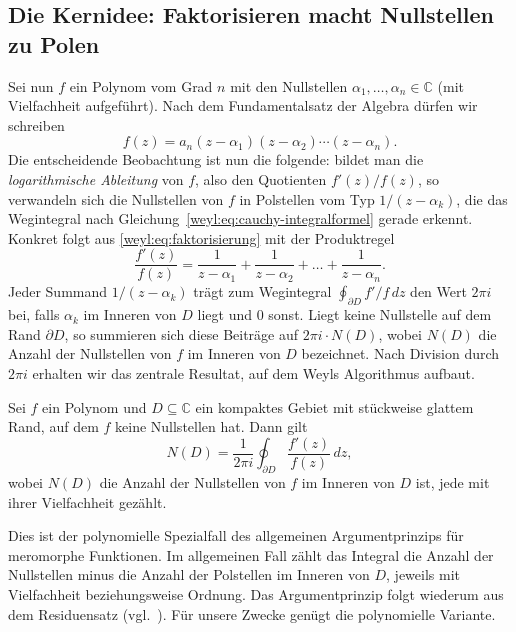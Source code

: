 \subsection{Die Kernidee: Faktorisieren macht Nullstellen zu Polen%
\label{weyl:subsection:kernidee}}
Sei nun $f$ ein Polynom vom Grad $n$ mit den Nullstellen $\alpha_1, \dots, \alpha_n \in \mathbb{C}$
(mit Vielfachheit aufgeführt).
Nach dem Fundamentalsatz der Algebra dürfen wir schreiben
%
\begin{equation}
f(z)
=
a_n (z - \alpha_1)(z - \alpha_2) \cdots (z - \alpha_n)
.
\label{weyl:eq:faktorisierung}
\end{equation}
Die entscheidende Beobachtung ist nun die folgende: bildet man die
\emph{logarithmische Ableitung} von $f$, also den Quotienten
%
$f'(z)/f(z)$, so verwandeln sich die Nullstellen von $f$ in Polstellen vom Typ
$1/(z - \alpha_k)$, die das Wegintegral nach Gleichung~\eqref{weyl:eq:cauchy-integralformel}
gerade erkennt.
Konkret folgt aus \eqref{weyl:eq:faktorisierung} mit der Produktregel
%
\begin{equation}
\frac{f'(z)}{f(z)}
=
\frac{1}{z - \alpha_1}
+
\frac{1}{z - \alpha_2}
+
\dots
+
\frac{1}{z - \alpha_n}
.
\label{weyl:eq:logarithmische-ableitung}
\end{equation}
Jeder Summand $1/(z - \alpha_k)$ trägt zum Wegintegral $\oint_{\partial D} f'/f \, dz$ den
Wert $2\pi i$ bei, falls $\alpha_k$ im Inneren von $D$ liegt und $0$ sonst.
Liegt keine Nullstelle auf dem Rand $\partial D$, so summieren sich diese Beiträge auf
$2\pi i \cdot N(D)$, wobei $N(D)$ die Anzahl der Nullstellen von $f$ im Inneren von
$D$ bezeichnet.
%
Nach Division durch $2\pi i$ erhalten wir das zentrale Resultat, auf dem Weyls
Algorithmus aufbaut.

\begin{satz}
\label{weyl:satz:nullstellen-zaehlen}
Sei $f$ ein Polynom und $D \subseteq \mathbb{C}$ ein kompaktes Gebiet mit stückweise
glattem Rand, auf dem $f$ keine Nullstellen hat.
Dann gilt
\begin{equation}
N(D)
=
\frac{1}{2\pi i}
\oint_{\partial D}
\frac{f'(z)}{f(z)}
\, dz
,
\label{weyl:eq:nullstellen-zaehlen}
\end{equation}
wobei $N(D)$ die Anzahl der Nullstellen von $f$ im Inneren von $D$ ist, jede mit ihrer
Vielfachheit gezählt.
\end{satz}

Dies ist der polynomielle Spezialfall des allgemeinen Argumentprinzips für
meromorphe Funktionen. Im allgemeinen Fall zählt das Integral die Anzahl der
Nullstellen minus die Anzahl der Polstellen im Inneren von $D$, jeweils mit
Vielfachheit beziehungsweise Ordnung. Das Argumentprinzip folgt wiederum aus dem
Residuensatz (vgl.~\cite{weyl:eisermann}). Für unsere Zwecke genügt die
polynomielle Variante.

